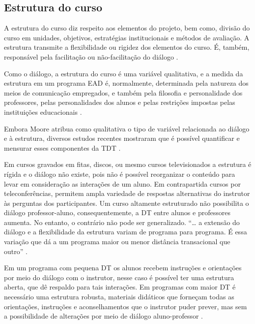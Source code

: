 \subsection{Estrutura do curso}

A estrutura do curso diz respeito aos elementos do projeto, bem como, divisão do
curso em unidades, objetivos, estratégias institucionais e métodos de avaliação.
A estrutura transmite a flexibilidade ou rigidez dos elementos do curso. É,
também, responsável pela facilitação ou não-facilitação do diálogo
\citeauthor{moore1973transational}.

Como o diálogo, a estrutura do curso é uma variável qualitativa, e a medida da
estrutura em um programa EAD é, normalmente, determinada pela natureza dos meios
de comunicação empregados, e também pela filosofia e personalidade dos
professores, pelas personalidades dos alunos e pelas restrições impostas pelas
instituições educacionais \citeauthor{moore1973transational}.

Embora Moore atribua como qualitativa o tipo de variável relacionada ao diálogo
e à estrutura, diversos estudos recentes mostraram que é possível quantificar e
mensurar esses componentes da TDT
\cite{zhang2003transactional,horzum2011developing,paul2015revisiting,
ramos2016abordagem}.

Em cursos gravados em fitas, discos, ou mesmo cursos televisionados a estrutura
é rígida e o diálogo não existe, pois não é possível reorganizar o conteúdo para
levar em consideração as interações de um aluno. Em contrapartida cursos por
teleconferências, permitem ampla variedade de respostas alternativas do
instrutor às perguntas dos participantes. Um curso altamente estruturado não
possibilita o diálogo professor-aluno, consequentemente, a DT entre alunos e
professores aumenta. No entanto, o contrário não pode ser generalizado. ``\ldots
a extensão do diálogo e a flexibilidade da estrutura variam de programa para
programa. É essa variação que dá a um programa maior ou menor distância
transacional que outro'' \citeauthor{moore1973transational}.

Em um programa com pequena DT os alunos recebem instruções e orientações por
meio do diálogo com o instrutor, nesse caso é possível ter uma estrutura aberta,
que dê respaldo para tais interações. Em programas com maior DT é necessário uma
estrutura robusta, materiais didáticos que forneçam todas as orientações,
instruções e aconselhamentos que o instrutor puder prever, mas sem a
possibilidade de alterações por meio de diálogo aluno-professor
\citeauthor{moore1973transational}.

